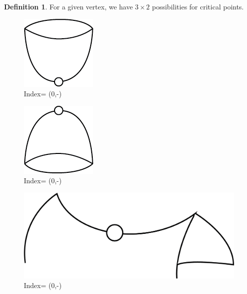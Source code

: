 \documentclass[a4paper]{article}
\theoremstyle{theorem}
\theoremstyle{definition}
\newtheorem{definition}{Definition} [section]
\theoremstyle{remark}
\theoremstyle{gremark}
\theoremstyle{discussion}
\theoremstyle{notation}
\begin{document}
\begin{definition}
	
	For a given vertex, we have $3\times 2$ possibilities for critical points.
	
	\begin{figure}[ht]
		\centering
		\includegraphics[scale=0.5]{minima.png}
		\caption{Index= (0,-)}
	\end{figure}

	\begin{figure}[ht]
		\centering
		\includegraphics[scale=0.5]{maxima.png}
		\caption{Index= (0,-)}
	\end{figure}
	
	\begin{figure}[ht]
		\centering
		\includegraphics[scale=0.5]{saddle_point.png}
		\caption{Index= (0,-)}
	\end{figure}
	
\end{definition}

\pagebreak
\end{document}
